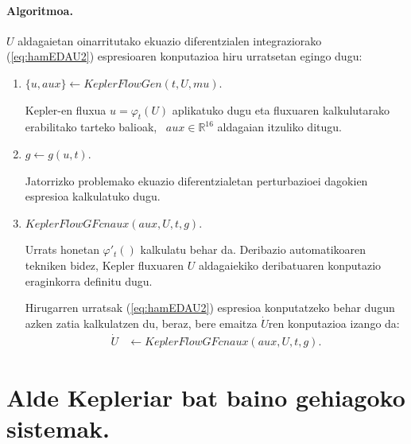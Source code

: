 \paragraph*{Algoritmoa.}
$U$ aldagaietan oinarritutako ekuazio diferentzialen integraziorako (\ref{eq:hamEDAU2}) espresioaren konputazioa hiru urratsetan egingo dugu:
\begin{enumerate}
\item $\{u,aux\} \leftarrow KeplerFlowGen (t,U,mu)$.

Kepler-en fluxua $u= \varphi_t(U)$ aplikatuko dugu eta fluxuaren kalkulutarako erabilitako tarteko balioak, ~$aux\in \mathbb{R}^{16}$ aldagaian itzuliko ditugu. 

\item $g \leftarrow g(u,t)$.

Jatorrizko problemako ekuazio diferentzialetan perturbazioei dagokien espresioa kalkulatuko dugu.

\item $KeplerFlowGFcnaux(aux,U,t,g)$.

Urrats honetan $\varphi'_t()$ kalkulatu behar da. Deribazio automatikoaren tekniken bidez, Kepler fluxuaren $U$ aldagaiekiko deribatuaren konputazio eraginkorra definitu dugu. 

Hirugarren urratsak (\ref{eq:hamEDAU2}) espresioa konputatzeko behar dugun azken zatia kalkulatzen du, beraz, bere emaitza $\dot{U}$ren konputazioa izango da: 
\begin{align*}
\dot{U}&\leftarrow KeplerFlowGFcnaux(aux,U,t,g).
\end{align*}

\end{enumerate} 



\section{Alde Kepleriar bat baino gehiagoko sistemak.}

